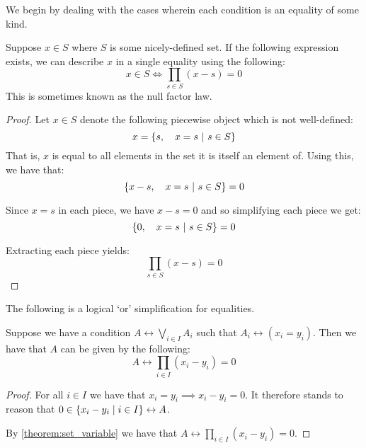 We begin by dealing with the cases wherein each condition is an equality of some kind.
\begin{theorem}
    Suppose $x\in S$ where $S$ is some nicely-defined set. If the following expression exists, we can describe $x$ in a single equality using the following:
    $$
        x\in S\iff \prod_{s\in S}{(x-s)}=0
    $$
    This is sometimes known as the null factor law.

    \begin{proof}
        \label{theorem:set_variable}
        Let $x\in S$ denote the following piecewise object which is not well-defined:
        $$
            x = \pwobj{s}{x=s}{s\in S}
        $$
        That is, $x$ is equal to all elements in the set it is itself an element of. Using this, we have that:
        $$
            \pwobj{x-s}{x=s}{s\in S}=0
        $$

        Since $x=s$ in each piece, we have $x-s=0$ and so simplifying each piece we get:
        $$
            \pwobj{0}{x=s}{s\in S}=0
        $$

        Extracting each piece yields:
        $$
            \prod_{s\in S}{(x-s)}=0
        $$
    \end{proof}
\end{theorem}
\begin{theorem}
    \label{theorem:logical_or_equality}
    The following is a logical `or' simplification for equalities.

    Suppose we have a condition $A\leftrightarrow \displaystyle\bigvee_{i\in I}{A_i}$ such that $A_i\leftrightarrow(x_i=y_i)$. Then we have that $A$ can be given by the following:
    $$
        A\leftrightarrow\prod_{i\in I}{(x_i-y_i)}=0
    $$

    \begin{proof}
        For all $i\in I$ we have that $x_i=y_i\implies x_i-y_i=0$. It therefore stands to reason that $0\in\br*{x_i-y_i\mid i\in I}\leftrightarrow A$.

        By \ref{theorem:set_variable} we have that $A\leftrightarrow \prod_{i\in I}{(x_i-y_i)}=0$.
    \end{proof}
\end{theorem}

